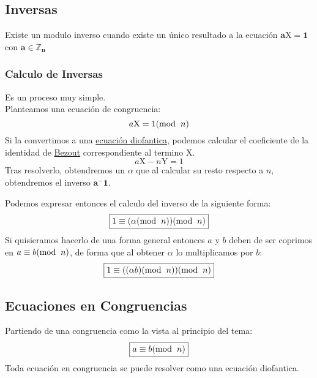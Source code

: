 \subsection{Inversas}
 Existe un modulo inverso cuando existe un único resultado a la ecuación \(\boxed{\mathbf{{a\mathrm{X} = 1}}}\) con \(\mathbf{a \in \mathbb{Z}_n}\)
\subsubsection{Calculo de Inversas}
 Es un proceso muy simple.\\ Planteamos una ecuación de congruencia:
\[
        a\mathrm{X} = 1 (\textnormal{mod}\hspace{2mm}n)
\]
 Si la convertimos a una \underline{ecuación diofantica}, podemos calcular el coeficiente de la identidad de \underline{Bezout} correspondiente al termino \(\mathrm{X}\).
\[
        a\mathrm{X} - n\mathrm{Y} = 1
\]
Tras resolverlo, obtendremos un \(\alpha\) que al calcular su resto respecto a \(n\), obtendremos el inverso \(\mathbf{a^-1}\).\par
 Podemos expresar entonces el calculo del inverso de la siguiente forma:
\[
        \boxed{1 \equiv (\alpha (\textnormal{mod}\hspace{2mm}n))(\textnormal{mod}\hspace{2mm}n)}
\]
 Si quisieramos hacerlo de una forma general entonces \(a\) y \(b\) deben de ser coprimos en \(a \equiv b(\textnormal{mod}\hspace{2mm}n)\), de forma que al obtener \(\alpha\) lo multiplicamos por \(b\):
\[
        \boxed{1 \equiv ((\alpha b) (\textnormal{mod}\hspace{2mm}n))(\textnormal{mod}\hspace{2mm}n)}
\]
\subsection{Ecuaciones en Congruencias}
 Partiendo de una congruencia como la vista al principio del tema:
\[
        \boxed{a \equiv b(\textnormal{mod}\hspace{2mm}n)}
\]
 Toda ecuación en congruencia se puede resolver como una ecuación diofantica.
